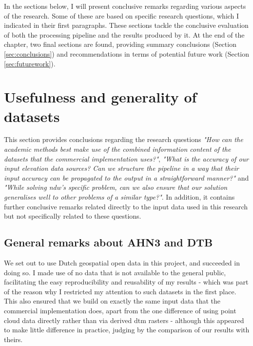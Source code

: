 In the sections below, I will present conclusive remarks regarding various aspects of the research. Some of these are based on specific research questions, which I indicated in their first paragraphs. These sections tackle the conclusive evaluation of both the processing pipeline and the results produced by it. At the end of the chapter, two final sections are found, providing summary conclusions (Section \ref{sec:conclusions}) and recommendations in terms of potential future work (Section \ref{sec:futurework}).

\section{Usefulness and generality of datasets}
\label{sec:usefulness}

This section provides conclusions regarding the research questions \textit{"How can the academic methods best make use of the combined information content of the datasets that the commercial implementation uses?"}, \textit{"What is the accuracy of our input elevation data sources? Can we structure the pipeline in a way that their input accuracy can be propagated to the output in a straightforward manner?"} and \textit{"While solving \ac{ndw}'s specific problem, can we also ensure that our solution generalises well to other problems of a similar type?"}. In addition, it contains further conclusive remarks related directly to the input data used in this research but not specifically related to these questions.

\subsection{General remarks about AHN3 and DTB}
\label{sub:usefulnessgeneral}

We set out to use Dutch geospatial open data in this project, and succeeded in doing so. I made use of no data that is not available to the general public, facilitating the easy reproducibility and reusability of my results - which was part of the reason why I restricted my attention to such datasets in the first place. This also ensured that we build on exactly the same input data that the commercial implementation does, apart from the one difference of using point cloud data directly rather than via derived \ac{dtm} rasters - although this appeared to make little difference in practice, judging by the comparison of our results with theirs.

